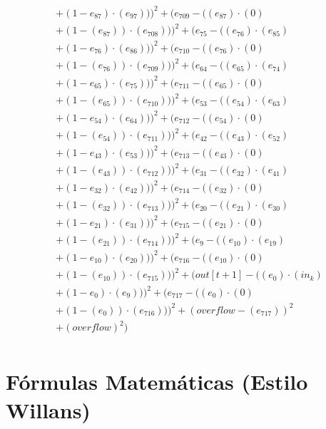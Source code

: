 \documentclass[10pt, a4paper]{article}
\begin{document}
\begin{small}
\begin{align*}
& + (1 - e_{87})  \cdot  (e_{97})))^{2} + (e_{709} - ((e_{87}) \cdot (0) \\
& + (1 - (e_{87})) \cdot (e_{708})))^{2} + (e_{75} - ((e_{76})  \cdot  (e_{85}) \\
& + (1 - e_{76})  \cdot  (e_{86})))^{2} + (e_{710} - ((e_{76}) \cdot (0) \\
& + (1 - (e_{76})) \cdot (e_{709})))^{2} + (e_{64} - ((e_{65})  \cdot  (e_{74}) \\
& + (1 - e_{65})  \cdot  (e_{75})))^{2} + (e_{711} - ((e_{65}) \cdot (0) \\
& + (1 - (e_{65})) \cdot (e_{710})))^{2} + (e_{53} - ((e_{54})  \cdot  (e_{63}) \\
& + (1 - e_{54})  \cdot  (e_{64})))^{2} + (e_{712} - ((e_{54}) \cdot (0) \\
& + (1 - (e_{54})) \cdot (e_{711})))^{2} + (e_{42} - ((e_{43})  \cdot  (e_{52}) \\
& + (1 - e_{43})  \cdot  (e_{53})))^{2} + (e_{713} - ((e_{43}) \cdot (0) \\
& + (1 - (e_{43})) \cdot (e_{712})))^{2} + (e_{31} - ((e_{32})  \cdot  (e_{41}) \\
& + (1 - e_{32})  \cdot  (e_{42})))^{2} + (e_{714} - ((e_{32}) \cdot (0) \\
& + (1 - (e_{32})) \cdot (e_{713})))^{2} + (e_{20} - ((e_{21})  \cdot  (e_{30}) \\
& + (1 - e_{21})  \cdot  (e_{31})))^{2} + (e_{715} - ((e_{21}) \cdot (0) \\
& + (1 - (e_{21})) \cdot (e_{714})))^{2} + (e_{9} - ((e_{10})  \cdot  (e_{19}) \\
& + (1 - e_{10})  \cdot  (e_{20})))^{2} + (e_{716} - ((e_{10}) \cdot (0) \\
& + (1 - (e_{10})) \cdot (e_{715})))^{2} + (out[t+1] - ((e_{0})  \cdot  (in_k) \\
& + (1 - e_{0})  \cdot  (e_{9})))^{2} + (e_{717} - ((e_{0}) \cdot (0) \\
& + (1 - (e_{0})) \cdot (e_{716})))^{2} + (overflow - (e_{717}))^{2} \\
& + (overflow)^{2}) \\
\end{align*}
\end{small}\part{Fórmulas Matemáticas (Estilo Willans)}
\end{document}

